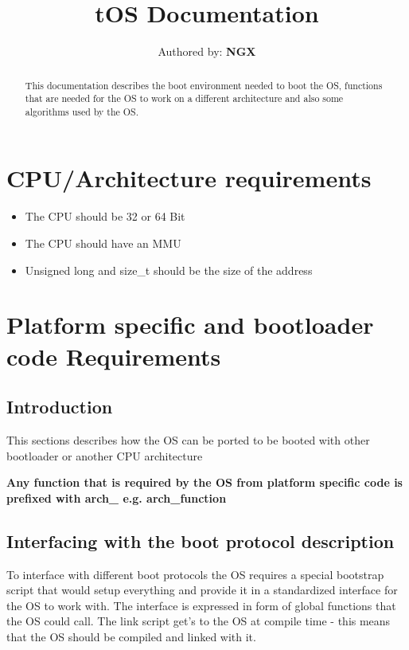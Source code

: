 \documentclass{report}
\title{ \textbf{tOS Documentation} }
\author{Authored by: \textbf{NGX}}
\begin{document}
\maketitle
	
	
	
	
\begin{abstract}
	This documentation describes the boot environment needed to boot the OS, functions that are needed for the OS to work on a different architecture and also some algorithms used by the OS.
\end{abstract}




\chapter{CPU/Architecture requirements}
\begin{itemize}
	\item The CPU should be 32 or 64 Bit
	\item The CPU should have an MMU
	\item Unsigned long and size\_t should be the size of the address
\end{itemize}


\chapter{Platform specific and bootloader code Requirements}
\section{Introduction}
This sections describes how the OS can be ported to be booted with other bootloader or another CPU architecture

\textbf{Any function that is required by the OS from platform specific code is prefixed with arch\_ e.g. arch\_function}



\section{Interfacing with the boot protocol description}
To interface with different boot protocols the OS requires a special bootstrap script that would setup everything and provide it in a standardized interface for the OS to work with. The interface is expressed in form of global functions that the OS could call. The link script get's to the OS at compile time - this means that the OS should be compiled and linked with it.
\end{document}

